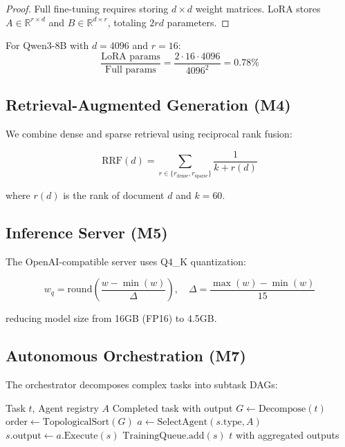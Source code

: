 \documentclass[11pt,a4paper]{article}
\theoremstyle{plain}
\theoremstyle{definition}
\newcommand{\R}{\mathbb{R}}
\begin{document}
\begin{proof}
Full fine-tuning requires storing $d \times d$ weight matrices. LoRA stores
$A \in \R^{r \times d}$ and $B \in \R^{d \times r}$, totaling $2rd$ parameters.
\end{proof}

For Qwen3-8B with $d = 4096$ and $r = 16$:
\begin{equation}
    \frac{\text{LoRA params}}{\text{Full params}} = \frac{2 \cdot 16 \cdot 4096}{4096^2} = 0.78\%
\end{equation}

\subsection{Retrieval-Augmented Generation (M4)}

We combine dense and sparse retrieval using reciprocal rank fusion:

\begin{equation}
    \text{RRF}(d) = \sum_{r \in \{r_{\text{dense}}, r_{\text{sparse}}\}} \frac{1}{k + r(d)}
    \label{eq:rrf}
\end{equation}

where $r(d)$ is the rank of document $d$ and $k = 60$.

\subsection{Inference Server (M5)}

The OpenAI-compatible server uses Q4\_K quantization:

\begin{equation}
    w_q = \text{round}\left(\frac{w - \min(w)}{\Delta}\right), \quad
    \Delta = \frac{\max(w) - \min(w)}{15}
    \label{eq:q4k}
\end{equation}

reducing model size from 16GB (FP16) to 4.5GB.

\subsection{Autonomous Orchestration (M7)}

The orchestrator decomposes complex tasks into subtask DAGs:

\begin{algorithm}[H]
\caption{Task Decomposition}
\begin{algorithmic}[1]
\REQUIRE Task $t$, Agent registry $A$
\ENSURE Completed task with output
\STATE $G \gets \text{Decompose}(t)$ 
\STATE $\text{order} \gets \text{TopologicalSort}(G)$
    \STATE $a \gets \text{SelectAgent}(s.\text{type}, A)$
    \STATE $s.\text{output} \gets a.\text{Execute}(s)$
        \STATE $\text{TrainingQueue}.\text{add}(s)$
    \ENDIF
\ENDFOR
\RETURN $t$ with aggregated outputs
\end{algorithmic}
\end{algorithm}
\end{document}
